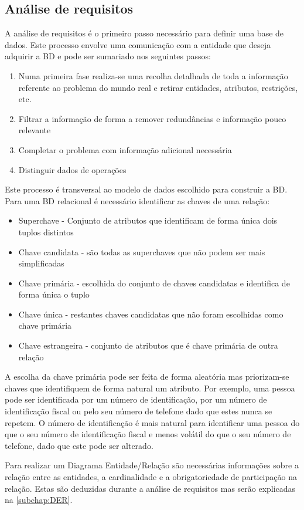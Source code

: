 \documentclass[11pt,twoside,a4paper]{report}
\begin{document}
\subsection{Análise de requisitos}
A análise de requisitos é o primeiro passo necessário para definir uma base de dados. Este processo envolve uma comunicação com a entidade que deseja adquirir a BD e pode ser sumariado nos seguintes passos:
\begin{enumerate}
	\item Numa primeira fase realiza-se uma recolha detalhada de toda a informação referente ao problema do mundo real e retirar entidades, atributos, restrições, etc.
	\item Filtrar a informação de forma a remover redundâncias e informação pouco relevante
	\item Completar o problema com informação adicional necessária
	\item Distinguir dados de operações
\end{enumerate}
Este processo é transversal ao modelo de dados escolhido para construir a BD. Para uma BD relacional é necessário identificar as chaves de uma relação:
\begin{itemize}
	\item Superchave - Conjunto de atributos que identificam de forma única dois tuplos distintos
	\item Chave candidata - são todas as superchaves que não podem ser mais simplificadas
	\item Chave primária - escolhida do conjunto de chaves candidatas e identifica de forma única o tuplo
	\item Chave única - restantes chaves candidatas que não foram escolhidas como chave primária
	\item Chave estrangeira - conjunto de atributos que é chave primária de outra relação
\end{itemize}
A escolha da chave primária pode ser feita de forma aleatória mas priorizam-se chaves que identifiquem de forma natural um atributo. Por exemplo, uma pessoa pode ser identificada por um número de identificação, por um número de identificação fiscal ou pelo seu número de telefone dado que estes nunca se repetem. O número de identificação é mais natural para identificar uma pessoa do que o seu número de identificação fiscal e menos volátil do que o seu número de telefone, dado que este pode ser alterado.\par 
Para realizar um Diagrama Entidade/Relação são necessárias informações sobre a relação entre as entidades, a cardinalidade e a obrigatoriedade de participação na relação. Estas são deduzidas durante a análise de requisitos mas serão explicadas na \autoref{subchap:DER}.
\end{document}
